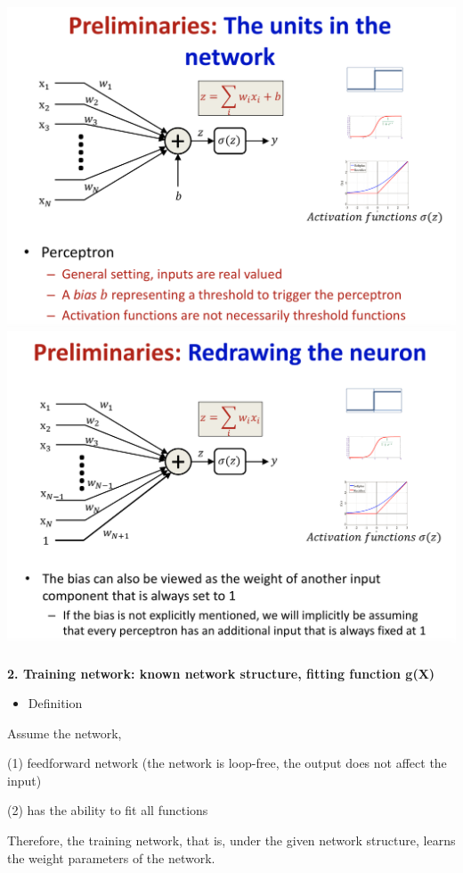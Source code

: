 \documentclass{article}
\begin{document}
	\includegraphics[scale=0.2]{41.png}
	\includegraphics[scale=0.2]{42.png} \\ \\
	
	\textbf{2. Training network: known network structure, fitting function g(X)}
	
	\begin{itemize}
		\item Definition
	\end{itemize}
	
	Assume the network, 
	
	(1) feedforward network (the network is loop-free, the output does not affect the input)
	
	(2) has the ability to fit all functions
	
	Therefore, the training network, that is, under the given network structure, learns the weight parameters of the network.
	
\end{document}
